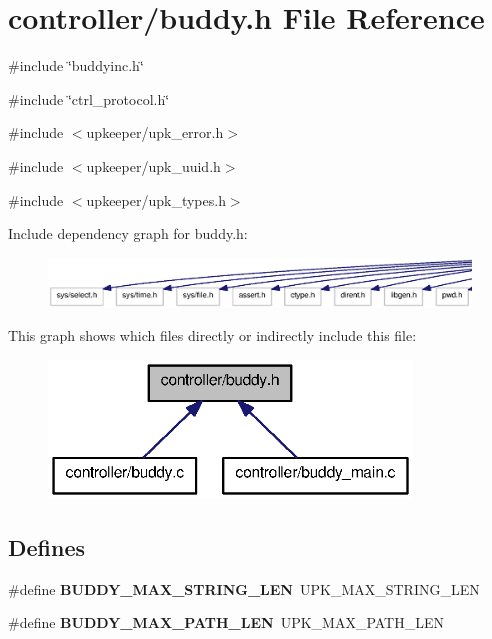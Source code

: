 \section{controller/buddy.h File Reference}
\label{buddy_8h}
{\ttfamily \#include \char`\"{}buddyinc.h\char`\"{}}\par
{\ttfamily \#include \char`\"{}ctrl\_\-protocol.h\char`\"{}}\par
{\ttfamily \#include $<$upkeeper/upk\_\-error.h$>$}\par
{\ttfamily \#include $<$upkeeper/upk\_\-uuid.h$>$}\par
{\ttfamily \#include $<$upkeeper/upk\_\-types.h$>$}\par
Include dependency graph for buddy.h:\nopagebreak
\begin{figure}[H]
\begin{center}
\leavevmode
\includegraphics[width=400pt]{buddy_8h__incl}
\end{center}
\end{figure}
This graph shows which files directly or indirectly include this file:\nopagebreak
\begin{figure}[H]
\begin{center}
\leavevmode
\includegraphics[width=274pt]{buddy_8h__dep__incl}
\end{center}
\end{figure}
\subsection*{Defines}
\begin{DoxyCompactItemize}
\item 
\#define {\bf BUDDY\_\-MAX\_\-STRING\_\-LEN}~UPK\_\-MAX\_\-STRING\_\-LEN
\item 
\#define {\bf BUDDY\_\-MAX\_\-PATH\_\-LEN}~UPK\_\-MAX\_\-PATH\_\-LEN
\end{DoxyCompactItemize}
